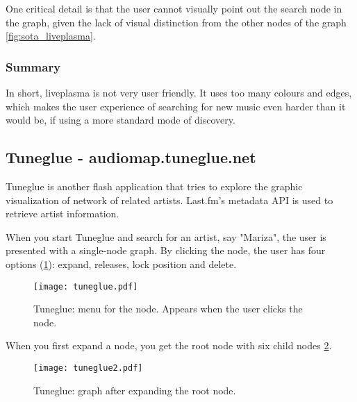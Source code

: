      One critical detail is that the user cannot visually point out the search node in the graph, given the lack of visual distinction from the other nodes of the graph \ref{fig:sota_liveplasma}.


    \subsubsection{Summary} %
    \label{ssub:liveplasma_summary}

      In short, liveplasma is not very user friendly. 
      It uses too many colours and edges, which makes the user experience of searching for new music even harder than it would be, if using a more standard mode of discovery.



  \subsection{Tuneglue - audiomap.tuneglue.net} %
  \label{sub:tuneglue}

    Tuneglue is another flash application that tries to explore the graphic visualization of network of related artists.
    Last.fm's metadata API is used to retrieve artist information.

    When you start Tuneglue and search for an artist, say "Mariza", the user is presented with a single-node graph.
    By clicking the node, the user has four options (\ref{fig:sota_tuneglue}): expand, releases, lock position and delete.


    \begin{figure}[hb]
      \begin{center}
        \texttt{[image: tuneglue.pdf]}
      \end{center}
      \caption{Tuneglue: menu for the node. Appears when the user clicks the node.}
      \label{fig:sota_tuneglue}
    \end{figure}

    When you first expand a node, you get the root node with six child nodes \ref{fig:sota_tuneglue2}.

    \begin{figure}[!h]
      \begin{center}
        \texttt{[image: tuneglue2.pdf]}
      \end{center}
      \caption{Tuneglue: graph after expanding the root node.}
      \label{fig:sota_tuneglue2}
    \end{figure}

